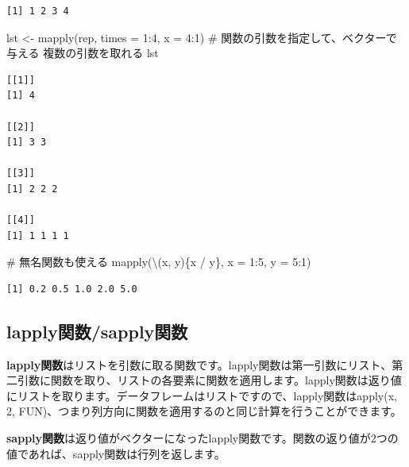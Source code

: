 \documentclass[
  letterpaper,
  DIV=11,
  numbers=noendperiod]{scrreprt}
\newenvironment{Shaded}{\begin{snugshade}}{\end{snugshade}}
\newcommand{\AttributeTok}[1]{\textcolor[rgb]{0.40,0.45,0.13}{#1}}
\newcommand{\CommentTok}[1]{\textcolor[rgb]{0.37,0.37,0.37}{#1}}
\newcommand{\DecValTok}[1]{\textcolor[rgb]{0.68,0.00,0.00}{#1}}
\newcommand{\FunctionTok}[1]{\textcolor[rgb]{0.28,0.35,0.67}{#1}}
\newcommand{\NormalTok}[1]{\textcolor[rgb]{0.00,0.23,0.31}{#1}}
\newcommand{\OtherTok}[1]{\textcolor[rgb]{0.00,0.23,0.31}{#1}}
\newcommand{\SpecialCharTok}[1]{\textcolor[rgb]{0.37,0.37,0.37}{#1}}
\begin{document}
\begin{verbatim}
[1] 1 2 3 4
\end{verbatim}

\begin{Shaded}
\begin{Highlighting}[]
\NormalTok{lst }\OtherTok{\textless{}{-}} \FunctionTok{mapply}\NormalTok{(rep, }\AttributeTok{times =} \DecValTok{1}\SpecialCharTok{:}\DecValTok{4}\NormalTok{, }\AttributeTok{x =} \DecValTok{4}\SpecialCharTok{:}\DecValTok{1}\NormalTok{) }\CommentTok{\# 関数の引数を指定して、ベクターで与える 複数の引数を取れる}
\NormalTok{lst}
\end{Highlighting}
\end{Shaded}

\begin{verbatim}
[[1]]
[1] 4

[[2]]
[1] 3 3

[[3]]
[1] 2 2 2

[[4]]
[1] 1 1 1 1
\end{verbatim}

\begin{Shaded}
\begin{Highlighting}[]
\CommentTok{\# 無名関数も使える}
\FunctionTok{mapply}\NormalTok{(\textbackslash{}(x, y)\{x }\SpecialCharTok{/}\NormalTok{ y\}, }\AttributeTok{x =} \DecValTok{1}\SpecialCharTok{:}\DecValTok{5}\NormalTok{, }\AttributeTok{y =} \DecValTok{5}\SpecialCharTok{:}\DecValTok{1}\NormalTok{)}
\end{Highlighting}
\end{Shaded}

\begin{verbatim}
[1] 0.2 0.5 1.0 2.0 5.0
\end{verbatim}

\hypertarget{lapplyux95a2ux6570sapplyux95a2ux6570}{%
\subsection{lapply関数/sapply関数}\label{lapplyux95a2ux6570sapplyux95a2ux6570}}

\textbf{lapply関数}はリストを引数に取る関数です。lapply関数は第一引数にリスト、第二引数に関数を取り、リストの各要素に関数を適用します。lapply関数は返り値にリストを取ります。データフレームはリストですので、lapply関数はapply(x,
2, FUN)、つまり列方向に関数を適用するのと同じ計算を行うことができます。

\textbf{sapply関数}は返り値がベクターになったlapply関数です。関数の返り値が2つの値であれば、sapply関数は行列を返します。
\end{document}

